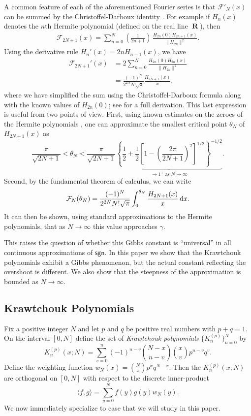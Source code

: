 \documentclass{amsart}
\newcommand{\R}{\operatorname{\mathbf{R}}}
\newcommand{\sgn}{\mathsf{sgn}}
\theoremstyle{plain}
\theoremstyle{remark}
\begin{document}
A common feature of each of the aforementioned Fourier series is that $\mathcal{F}'_N(x)$ can be summed by the Christoffel-Darboux identity \cite[Thm.~3.2.2]{szego}.  For example if $H_n(x)$ denotes the $n$th Hermite polynomial (defined on the real line $\R$), then 
\begin{align*}
\mathcal{F}_{2N+1}(x) = \sum_{n=0}^N \left( \frac{1}{2n+1} \right) \, \frac{H_{2n}(0) H_{2n+1}(x)}{\|H_{2n}\|^2}. 
\end{align*}
Using the derivative rule $H_n'(x) = 2nH_{n-1}(x)$, we have 
\begin{align*}
\mathcal{F}_{2N+1}'(x) &= 2 \sum_{n=0}^N  \frac{H_{2n}(0) H_{2n}(x)}{\|H_{2n}\|^2} \\
&= \frac{(-1)^N}{2^{2N}N!\sqrt{\pi}} \frac{H_{2N+1}(x)}{x},
\end{align*}
where we have simplified the sum using the Christoffel-Darboux formula along with the known values of $H_{2n}(0)$; see \cite[\S 3]{cs} for a full derivation.  This last expression is useful from two points of view.  First, using known estimates on the zeroes of the Hermite polynomials \cite[(6.31.20), (6.31.23)]{szego}, one can approximate the smallest critical point $\theta_N$ of $H_{2N+1}(x)$ as 
\[
\frac{\pi}{\sqrt{2N+1}} < \theta_N < \frac{\pi}{\sqrt{2N+1}} \underbrace{\left\{ \frac{1}{2} + \frac{1}{2} \left[1 - \left( \frac{2\pi}{2N+1} \right)^2 \right]^{1/2}\right\}^{-1/2}}_{\to 1^+ \text{ as } N \to \infty}. 
\]
Second, by the fundamental theorem of calculus, we can write
\[
\mathcal{F}_N(\theta_N) = \frac{(-1)^N}{2^{2N}N!\sqrt{\pi}} \int_0^{\theta_N}  \frac{H_{2N+1}(x)}{x}\,{\rm d}x.
\]
It can then be shown, using standard approximations to the Hermite polynomials, that as $N \to \infty$ this value approaches $\gamma$. 

This raises the question of whether this Gibbs constant is ``universal'' in all continuous approximations of $\sgn$. In this paper we show that the {Krawtchouk polynomials} exhibit a Gibbs phenomenon, but the actual constant reflecting the overshoot is different. We also show that the steepness of the approximation is bounded as $N \to \infty$.

\subsection{Krawtchouk Polynomials} Fix a positive integer $N$ and let $p$ and $q$ be positive real numbers with $p+q = 1$.  On the interval $[0,N]$ define the set of \emph{Krawtchouk polynomials} $\lbrace K_n^{(p)} \rbrace_{n=0}^N$ by 
\[
K_n^{(p)}(x;N)	= \sum_{v=0}^n(-1)^{n-v}\binom{N-x}{n-v}\binom{x}{v}p^{n-v}q^v.
\]
Define the weighting function $w_N(x) = \binom{N}{x}p^xq^{N-x}$.  Then the $K_n^{(p)}(x;N)$ are orthogonal on $[0,N]$ with respect to the discrete inner-product 
\[
\langle f,g\rangle = \sum_{y=0}^N f(y)g(y) w_N(y).
\]
We now immediately specialize to case that we will study in this paper.
\end{document}
